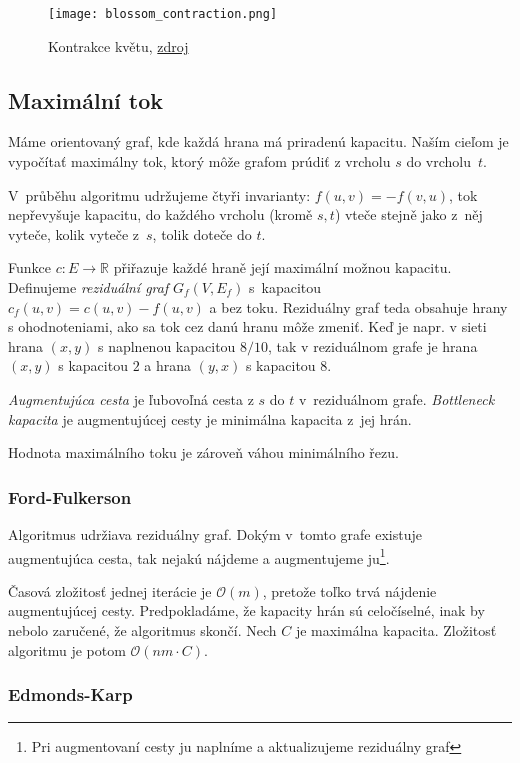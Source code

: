 \begin{figure}[H]
    \centering
    \texttt{[image: blossom\_contraction.png]}
    \caption{Kontrakce květu, \href{https://en.wikipedia.org/wiki/Blossom_algorithm}{zdroj}}
\end{figure}

\subsection{Maximální tok}
Máme orientovaný graf, kde každá hrana má priradenú kapacitu.
Naším cieľom je vypočítať maximálny tok, ktorý môže
grafom prúdiť z vrcholu $s$ do vrcholu~$t$.

V~průběhu algoritmu udržujeme čtyři invarianty:
$f(u,v) = -f(v,u)$, tok nepřevyšuje kapacitu,
do každého vrcholu (kromě $s,t$) vteče stejně jako z~něj vyteče,
kolik vyteče z~$s$, tolik doteče do $t$.

Funkce $c : E \to \mathbb{R}$ přiřazuje každé hraně její maximální
možnou kapacitu. Definujeme {\em reziduální graf}
$G_{f}(V,E_{f})$ s~kapacitou $c_{f}(u,v)=c(u,v)-f(u,v)$ a bez toku.
Reziduálny graf teda obsahuje hrany s ohodnoteniami, ako sa tok
cez danú hranu môže zmeniť. Keď je napr. v sieti hrana $(x,y)$
s naplnenou kapacitou $8/10$, tak v reziduálnom grafe je
hrana $(x,y)$ s kapacitou $2$ a hrana $(y,x)$ s kapacitou $8$.

{\em Augmentujúca cesta} je ľubovoľná cesta z $s$ do $t$
v~reziduálnom grafe. {\em Bottleneck kapacita} je augmentujúcej
cesty je minimálna kapacita z~jej hrán.

\begin{theorem}
Hodnota maximálního toku je zároveň váhou minimálního řezu.
\end{theorem}

\subsubsection*{Ford-Fulkerson}
Algoritmus udržiava reziduálny graf. Dokým v~tomto grafe
existuje augmentujúca cesta, tak nejakú nájdeme a 
augmentujeme ju\footnote{Pri augmentovaní cesty ju naplníme 
a aktualizujeme reziduálny graf}.

Časová zložitosť jednej iterácie je $\mathcal{O}(m)$, pretože
toľko trvá nájdenie augmentujúcej cesty. Predpokladáme, že 
kapacity hrán sú celočíselné, inak by nebolo zaručené, že algoritmus skončí. 
Nech $C$ je maximálna kapacita. Zložitosť algoritmu je potom $\mathcal{O}(nm \cdot C)$.

\subsubsection*{Edmonds-Karp}

